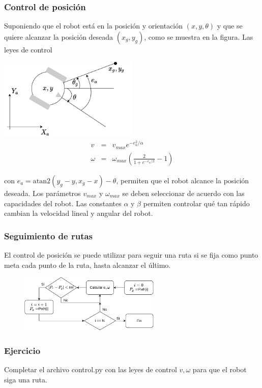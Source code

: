 \begin{frame}\frametitle{Control de posición}
  Suponiendo que el robot está en la posición y orientación $(x,y, \theta)$ y que se quiere alcanzar la posición deseada $(x_g, y_g)$, como se muestra en la figura. Las leyes de control
  \begin{multicols}{2}
    \includegraphics[width=0.5\textwidth]{Figures/GoalPose.pdf}
    \[\]
  \begin{eqnarray*}
    v &=& v_{max} e^{-e_a^2/\alpha}\\
    \omega &=& \omega_{max}\left(\frac{2}{1 + e^{-e_a/\beta}} - 1\right)
  \end{eqnarray*}
  \end{multicols}
  con $e_a = \textrm{atan2}(y_g - y, x_g - x) - \theta$, permiten que el robot alcance la posición deseada. Los parámetros $v_{max}$ y $\omega_{max}$ se deben seleccionar de acuerdo con las capacidades del robot. Las constantes $\alpha$ y $\beta$ permiten controlar qué tan rápido cambian la velocidad lineal y angular del robot. 
\end{frame}


\begin{frame}\frametitle{Seguimiento de rutas}
  El control de posición se puede utilizar para seguir una ruta si se fija como punto meta cada punto de la ruta, hasta alcanzar el último.
  \begin{figure}
    \centering
    \includegraphics[width=0.6\textwidth]{Figures/PathFollowing.pdf}
  \end{figure}
\end{frame}


\begin{frame}[containsverbatim]\frametitle{Ejercicio}
  Completar el archivo control.py con las leyes de control $v,\omega$ para que el robot siga una ruta.
    
\end{frame}

